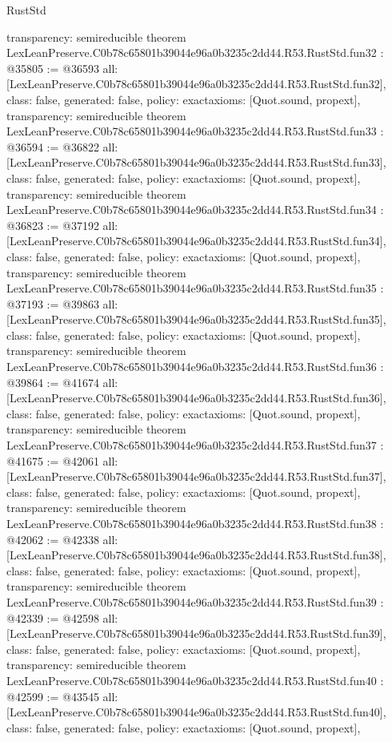 \begin{lexlean}{RustStd}
\begin{coremodule}
{  transparency: semireducible
}
theorem LexLeanPreserve.C0b78c65801b39044e96a0b3235c2dd44.R53.RustStd.fun32 : @35805 := @36593 {
  all: [LexLeanPreserve.C0b78c65801b39044e96a0b3235c2dd44.R53.RustStd.fun32],
  class: false,
  generated: false,
  policy: exact{axioms: [Quot.sound, propext]},
  transparency: semireducible
}
theorem LexLeanPreserve.C0b78c65801b39044e96a0b3235c2dd44.R53.RustStd.fun33 : @36594 := @36822 {
  all: [LexLeanPreserve.C0b78c65801b39044e96a0b3235c2dd44.R53.RustStd.fun33],
  class: false,
  generated: false,
  policy: exact{axioms: [Quot.sound, propext]},
  transparency: semireducible
}
theorem LexLeanPreserve.C0b78c65801b39044e96a0b3235c2dd44.R53.RustStd.fun34 : @36823 := @37192 {
  all: [LexLeanPreserve.C0b78c65801b39044e96a0b3235c2dd44.R53.RustStd.fun34],
  class: false,
  generated: false,
  policy: exact{axioms: [Quot.sound, propext]},
  transparency: semireducible
}
theorem LexLeanPreserve.C0b78c65801b39044e96a0b3235c2dd44.R53.RustStd.fun35 : @37193 := @39863 {
  all: [LexLeanPreserve.C0b78c65801b39044e96a0b3235c2dd44.R53.RustStd.fun35],
  class: false,
  generated: false,
  policy: exact{axioms: [Quot.sound, propext]},
  transparency: semireducible
}
theorem LexLeanPreserve.C0b78c65801b39044e96a0b3235c2dd44.R53.RustStd.fun36 : @39864 := @41674 {
  all: [LexLeanPreserve.C0b78c65801b39044e96a0b3235c2dd44.R53.RustStd.fun36],
  class: false,
  generated: false,
  policy: exact{axioms: [Quot.sound, propext]},
  transparency: semireducible
}
theorem LexLeanPreserve.C0b78c65801b39044e96a0b3235c2dd44.R53.RustStd.fun37 : @41675 := @42061 {
  all: [LexLeanPreserve.C0b78c65801b39044e96a0b3235c2dd44.R53.RustStd.fun37],
  class: false,
  generated: false,
  policy: exact{axioms: [Quot.sound, propext]},
  transparency: semireducible
}
theorem LexLeanPreserve.C0b78c65801b39044e96a0b3235c2dd44.R53.RustStd.fun38 : @42062 := @42338 {
  all: [LexLeanPreserve.C0b78c65801b39044e96a0b3235c2dd44.R53.RustStd.fun38],
  class: false,
  generated: false,
  policy: exact{axioms: [Quot.sound, propext]},
  transparency: semireducible
}
theorem LexLeanPreserve.C0b78c65801b39044e96a0b3235c2dd44.R53.RustStd.fun39 : @42339 := @42598 {
  all: [LexLeanPreserve.C0b78c65801b39044e96a0b3235c2dd44.R53.RustStd.fun39],
  class: false,
  generated: false,
  policy: exact{axioms: [Quot.sound, propext]},
  transparency: semireducible
}
theorem LexLeanPreserve.C0b78c65801b39044e96a0b3235c2dd44.R53.RustStd.fun40 : @42599 := @43545 {
  all: [LexLeanPreserve.C0b78c65801b39044e96a0b3235c2dd44.R53.RustStd.fun40],
  class: false,
  generated: false,
  policy: exact{axioms: [Quot.sound, propext]},
}
\end{coremodule}
\end{lexlean}
